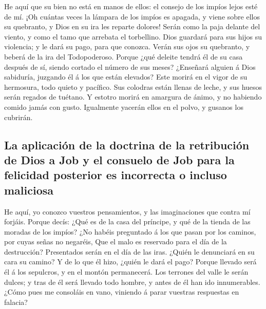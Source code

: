  He aquí que su bien no está en manos de ellos: el
consejo de los impíos lejos esté de mí.  ¡Oh cuántas
veces la lámpara de los impíos es apagada, y viene sobre ellos su
quebranto, y Dios en su ira les reparte dolores!  Serán
como la paja delante del viento, y como el tamo que arrebata el
torbellino.  Dios guardará para sus hijos su violencia; y
le dará su pago, para que conozca.  Verán sus ojos su
quebranto, y beberá de la ira del Todopoderoso.  Porque
¿qué deleite tendrá él de su casa después de sí, siendo cortado el
número de sus meses?  ¿Enseñará alguien á Dios sabiduría,
juzgando él á los que están elevados?  Este morirá en el
vigor de su hermosura, todo quieto y pacífico.  Sus
colodras están llenas de leche, y sus huesos serán regados de tuétano.
 Y estotro morirá en amargura de ánimo, y no habiendo
comido jamás con gusto.  Igualmente yacerán ellos en el
polvo, y gusanos los cubrirán.

\hypertarget{la-aplicaciuxf3n-de-la-doctrina-de-la-retribuciuxf3n-de-dios-a-job-y-el-consuelo-de-job-para-la-felicidad-posterior-es-incorrecta-o-incluso-maliciosa}{%
\subsection{La aplicación de la doctrina de la retribución de Dios a Job
y el consuelo de Job para la felicidad posterior es incorrecta o incluso
maliciosa}\label{la-aplicaciuxf3n-de-la-doctrina-de-la-retribuciuxf3n-de-dios-a-job-y-el-consuelo-de-job-para-la-felicidad-posterior-es-incorrecta-o-incluso-maliciosa}}

 He aquí, yo conozco vuestros pensamientos, y las
imaginaciones que contra mí forjáis.  Porque decís: ¿Qué
es de la casa del príncipe, y qué de la tienda de las moradas de los
impíos?  ¿No habéis preguntado á los que pasan por los
caminos, por cuyas señas no negaréis,  Que el malo es
reservado para el día de la destrucción? Presentados serán en el día de
las iras.  ¿Quién le denunciará en su cara su camino? Y
de lo que él hizo, ¿quién le dará el pago?  Porque
llevado será él á los sepulcros, y en el montón permanecerá.
 Los terrones del valle le serán dulces; y tras de él
será llevado todo hombre, y antes de él han ido innumerables.
 ¿Cómo pues me consoláis en vano, viniendo á parar
vuestras respuestas en falacia?

